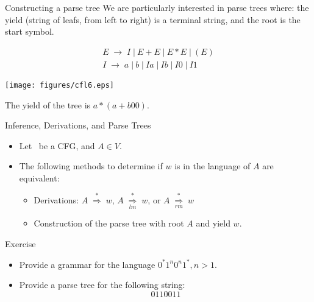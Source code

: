 \documentclass{prosper}%
\newcommand{\e} {{\mbox{$\epsilon$}}}
\newcommand{\ra}{\mbox{$\;\rightarrow\;$}}
\newcommand{\vb}{\mbox{$\;|\:$}}
\newcommand{\cdra}{\mbox{$\;\stackrel{*}{\Rightarrow}\;$}}
\newcommand{\lmdstar}{\mbox{$\;\underset{lm}{\stackrel{*}{\Rightarrow}}\;$}}
\newcommand{\rmdstar}{\mbox{$\;\underset{rm}{\stackrel{*}{\Rightarrow}}\;$}}
\begin{document}
\begin{slide}{Constructing a parse tree}
We are particularly interested in parse trees where: the {\blue yield} ({string of leafs, from left to right}) is a terminal string, and the root is the start symbol.
\begin{minipage}{6cm}
\[
\begin{array}{l}
E \ra I \vb E+E\vb E*E\vb (E)\\
I\ra a\vb b \vb Ia \vb Ib \vb I0 \vb I1
\end{array}
\]
\end{minipage}
\begin{minipage}{4cm}
\texttt{[image: figures/cfl6.eps]}
\end{minipage}

The {\blue yield} of the tree is $a*(a+b00)$.
\end{slide}

\begin{slide}{Inference, Derivations, and Parse Trees}
\begin{itemize}
\item Let \ be a CFG, and $A\in V$. 
\item The following methods to determine if $w$ is in the language of $A$ are {\blue equivalent}: 
\begin{itemize}
\item Derivations: $A\cdra w$, $A\lmdstar w$, or $A\rmdstar w$
\item Construction of the parse tree with root $A$ and yield $w$.
\end{itemize}
\end{itemize}
\end{slide}

\begin{slide}{Exercise}
\begin{itemize}
\item  Provide a grammar for the language $0^*1^n0^n1^*, n>1$.
\begin{comment}
\[
\begin{array}{l}
S\ra A1B\\
A \ra 0A \vb \e\\
B \ra 0B \vb 1B \vb \e
\end{array}
\]
\end{comment}
\item Provide a parse tree for the following string:
\[
0110011
\]
\end{itemize}
\end{slide}
\end{document}

